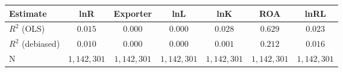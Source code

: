 \begin{tabular}{l*{6}{c}}
\hline\hline
 Estimate & lnR & Exporter & lnL & lnK & ROA & lnRL \\
\hline
\addlinespace $ R^2$ (OLS) & $0.015$ & $0.000$ & $0.000$ & $0.028$ & $0.629$ & $0.023$ \\
$ R^2$ (debiased) & $0.010$ & $0.000$ & $0.000$ & $0.001$ & $0.212$ & $0.016$ \\
N & $1,142,301$ & $1,142,301$ & $1,142,301$ & $1,142,301$ & $1,142,301$ & $1,142,301$ \\
\hline\hline
\end{tabular}
